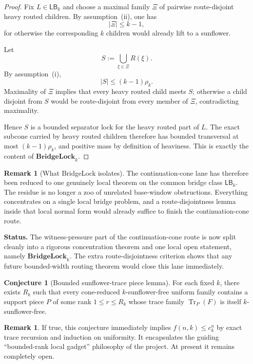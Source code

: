 \documentclass[11pt]{article}
\theoremstyle{definition}
\newtheorem{conjecture}[theorem]{Conjecture}
\newtheorem{remark}[theorem]{Remark}
\newcommand{\Tr}{\operatorname{Tr}}
\newcommand{\1}{\mathbf{1}}
\newcommand{\status}[1]{\par\smallskip\noindent\textbf{Status.} #1\par\smallskip}
\begin{document}
\begin{proof}
Fix $L\in \mathsf{LB}_k$ and choose a maximal family $\Xi$ of pairwise route-disjoint heavy routed children. By assumption~(ii), one has
\[
|\Xi|\le k-1,
\]
for otherwise the corresponding $k$ children would already lift to a sunflower.

Let
\[
S:=\bigcup_{\xi\in \Xi} R(\xi).
\]
By assumption~(i),
\[
|S|\le (k-1)\rho_k.
\]
Maximality of $\Xi$ implies that every heavy routed child meets $S$; otherwise a child disjoint from $S$ would be route-disjoint from every member of $\Xi$, contradicting maximality.

Hence $S$ is a bounded separator lock for the heavy routed part of $L$. The exact subcone carried by heavy routed children therefore has bounded transversal at most $(k-1)\rho_k$, and positive mass by definition of heaviness. This is exactly the content of $\mathbf{BridgeLock}_k$.
\end{proof}

\begin{remark}[What BridgeLock isolates]\label{rem:bridgelock-isolates}
The continuation-cone lane has therefore been reduced to one genuinely local theorem on the common bridge class $\mathsf{LB}_k$. The residue is no longer a zoo of unrelated base-window obstructions. Everything concentrates on a single local bridge problem, and a route-disjointness lemma inside that local normal form would already suffice to finish the continuation-cone route.
\end{remark}

\status{The witness-pressure part of the continuation-cone route is now split cleanly into a rigorous concentration theorem and one local open statement, namely $\mathbf{BridgeLock}_k$. The extra route-disjointness criterion shows that any future bounded-width routing theorem would close this lane immediately.}


\begin{conjecture}[Bounded sunflower-trace piece lemma]
For each fixed $k$, there exists $R_k$ such that every cone-reduced $k$-sunflower-free uniform family contains a support piece $P$ of some rank $1\le r\le R_k$ whose trace family $\Tr_P(F)$ is itself $k$-sunflower-free.
\end{conjecture}

\begin{remark}
If true, this conjecture immediately implies $f(n,k)\le c_k^n$ by exact trace recursion and induction on uniformity. It encapsulates the guiding ``bounded-rank local gadget'' philosophy of the project. At present it remains completely open.
\end{remark}
\end{document}
